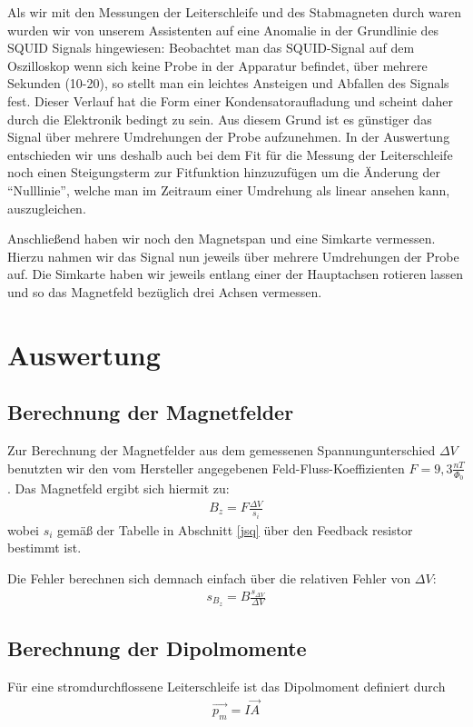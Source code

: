 \documentclass[12pt]{article}
\begin{document}
Als wir mit den Messungen der Leiterschleife und des Stabmagneten durch waren wurden wir von unserem Assistenten auf eine Anomalie in der Grundlinie des SQUID Signals hingewiesen: Beobachtet man das SQUID-Signal auf dem Oszilloskop wenn sich keine Probe in der Apparatur befindet, über mehrere Sekunden (10-20), so stellt man ein leichtes Ansteigen und Abfallen des Signals fest. Dieser Verlauf hat die Form einer Kondensatoraufladung und scheint daher durch die Elektronik bedingt zu sein. Aus diesem Grund ist es günstiger das Signal über mehrere Umdrehungen der Probe aufzunehmen. In der Auswertung entschieden wir uns deshalb auch bei dem Fit für die Messung der Leiterschleife noch einen Steigungsterm zur Fitfunktion hinzuzufügen um die Änderung der "`Nulllinie"', welche man im Zeitraum einer Umdrehung als linear ansehen kann, auszugleichen.

Anschließend haben wir noch den Magnetspan und eine Simkarte vermessen. Hierzu nahmen wir das Signal nun jeweils über mehrere Umdrehungen der Probe auf.
Die Simkarte haben wir jeweils entlang einer der Hauptachsen rotieren lassen und so das Magnetfeld bezüglich drei Achsen vermessen.

\section{Auswertung}
\subsection{Berechnung der Magnetfelder}
Zur Berechnung der Magnetfelder aus dem gemessenen Spannungunterschied $\varDelta V$ benutzten wir den vom Hersteller angegebenen Feld-Fluss-Koeffizienten $F=9,3 \frac{nT}{\Phi_0}$. Das Magnetfeld ergibt sich hiermit zu:
\begin{align}
 B_z=F \frac{\varDelta V}{s_i}
\end{align}
wobei $s_i$ gemäß der Tabelle in Abschnitt \ref{jsq} über den Feedback resistor bestimmt ist.

Die Fehler berechnen sich demnach einfach über die relativen Fehler von $\varDelta V$:
\begin{align}
 s_{B_z} = B \frac{s_{\varDelta V}}{\varDelta V}
\end{align}
\subsection{Berechnung der Dipolmomente}
Für eine stromdurchflossene Leiterschleife ist das Dipolmoment definiert durch
\begin{align}
 \vec{p_m}=I \vec{A}
\end{align}
\end{document}
